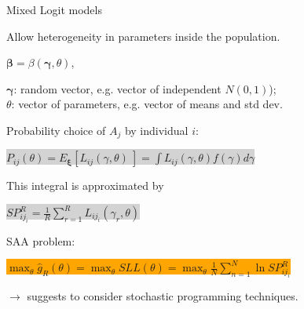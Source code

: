 \documentclass[aspectratio=169]{beamer}
\def\bxi{\boldsymbol\xi}
\begin{document}

	\begin{frame}{Mixed Logit models}
		
		\begin{footnotesize}
			Allow {\red heterogeneity} in parameters inside the population.
			\begin{center}
				$\boldsymbol{\beta} = \beta(\boldsymbol{\gamma}, \theta)$,
			\end{center}
			$\boldsymbol{\gamma}$: {\blue random vector}, e.g. vector of independent
			$N(0,1)$);\\
			$\theta$: {\blue vector of parameters}, e.g. vector of means and std dev.
			
				Probability choice of $A_j$ by individual $i$:
				\begin{center}
					\colorbox{lightgray}{
						$P_{ij} (\theta) = E_{\bxi} \left[ L_{ij} (\gamma, \theta)\ \right] =
						\int { L_{ij} (\gamma, \theta)} f(\gamma) d\gamma$
					}
				\end{center}
				
				This integral is approximated by
				\begin{center}
					\colorbox{lightgray}{
						$SP_{ij_i}^{R} = \frac{1}{R} \sum_{r= 1}^R L_{ij_i} (\gamma_r, \theta)$
					}
				\end{center}

				{\red SAA} problem:
				\begin{center}
					\colorbox{orange}{
						$\max_{\theta} \hat{g}_R(\theta) = \max_{\theta} SLL(\theta) =
						\max_{\theta} \frac{1}{N} \sum_{n = 1}^{N} \ln SP_{ij_i}^{R}$
					}
				\end{center}
			
				$\rightarrow$ suggests to consider {\blue stochastic programming}
				techniques.
			
		\end{footnotesize}
		
\end{frame}
\end{document}
